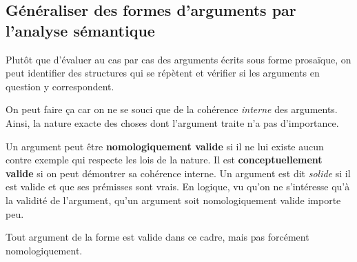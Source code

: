 \documentclass[fleqn,a4paper,nobib]{tufte-handout}
\begin{document}

\subsection{Généraliser des formes d'arguments par l'analyse sémantique}

Plutôt que d'évaluer au cas par cas des arguments écrits sous forme
prosaïque, on peut identifier des structures qui se répètent et
vérifier si les arguments en question y correspondent.

On peut faire ça car on ne se souci que de la cohérence \textit{interne}
des arguments. Ainsi, la nature exacte des choses dont l'argument
traite n'a pas d'importance.

Un argument peut être \textbf{nomologiquement valide} si il ne lui
existe aucun contre exemple qui respecte les lois de la nature.
Il est \textbf{conceptuellement valide} si on peut démontrer sa
cohérence interne. Un argument est dit \textit{solide} si il est
valide et que ses prémisses sont vrais. En logique, vu qu'on ne
s'intéresse qu'à la validité de l'argument, qu'un argument soit
nomologiquement valide importe peu.


Tout argument de la forme
est valide dans ce cadre, mais pas forcément nomologiquement.
\end{document}

